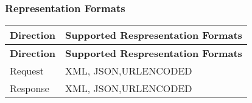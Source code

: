 
\subsubsection{Representation Formats}

\begin{comment}
In the table below, describe supported representation formats for
the request and response body. Where different versions support different
formats, provide separate tables and indicate which versions apply
to each table. 
\end{comment}


\begin{longtable}{|>{\raggedright}p{}|>{\raggedright}p{}|}
\hline
\hline 
\textbf{\footnotesize{Direction}} & \textbf{\footnotesize{Supported Respresentation Formats}}\tabularnewline
\hline 
\hline
\endfirsthead
\hline
\hline 
\textbf{\footnotesize{Direction}} & \textbf{\footnotesize{Supported Respresentation Formats}}\tabularnewline
\hline 
\hline
\endhead
\hline 
{\footnotesize{Request}} & {\footnotesize{XML, JSON,URLENCODED}}\tabularnewline
\hline 
{\footnotesize{Response}} & {\footnotesize{XML, JSON,URLENCODED}}\tabularnewline
\hline 
\end{longtable}
